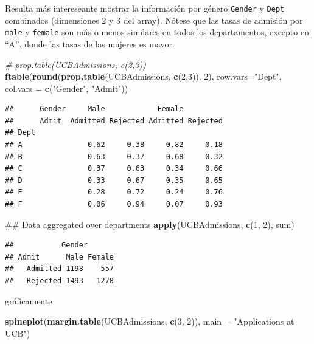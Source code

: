 \documentclass[]{article}
\newenvironment{Shaded}{\begin{snugshade}}{\end{snugshade}}
\newcommand{\KeywordTok}[1]{\textcolor[rgb]{0.13,0.29,0.53}{\textbf{{#1}}}}
\newcommand{\DataTypeTok}[1]{\textcolor[rgb]{0.13,0.29,0.53}{{#1}}}
\newcommand{\DecValTok}[1]{\textcolor[rgb]{0.00,0.00,0.81}{{#1}}}
\newcommand{\StringTok}[1]{\textcolor[rgb]{0.31,0.60,0.02}{{#1}}}
\newcommand{\CommentTok}[1]{\textcolor[rgb]{0.56,0.35,0.01}{\textit{{#1}}}}
\newcommand{\NormalTok}[1]{{#1}}
\numberwithin{equation}{section}
\begin{document}
Resulta más intereseante mostrar la información por género
\texttt{Gender} y \texttt{Dept} combinados (dimensiones 2 y 3 del
array). Nótese que las tasas de admisión por \texttt{male} y
\texttt{female} son más o menos similares en todos los departamentos,
excepto en ``A'', donde las tasas de las mujeres es mayor.

\begin{Shaded}
\begin{Highlighting}[]
\CommentTok{# prop.table(UCBAdmissions, c(2,3))}
\KeywordTok{ftable}\NormalTok{(}\KeywordTok{round}\NormalTok{(}\KeywordTok{prop.table}\NormalTok{(UCBAdmissions, }\KeywordTok{c}\NormalTok{(}\DecValTok{2}\NormalTok{,}\DecValTok{3}\NormalTok{)), }\DecValTok{2}\NormalTok{),}
       \DataTypeTok{row.vars=}\StringTok{"Dept"}\NormalTok{, }\DataTypeTok{col.vars =} \KeywordTok{c}\NormalTok{(}\StringTok{"Gender"}\NormalTok{, }\StringTok{"Admit"}\NormalTok{))}
\end{Highlighting}
\end{Shaded}

\begin{verbatim}
##      Gender     Male            Female         
##      Admit  Admitted Rejected Admitted Rejected
## Dept                                           
## A               0.62     0.38     0.82     0.18
## B               0.63     0.37     0.68     0.32
## C               0.37     0.63     0.34     0.66
## D               0.33     0.67     0.35     0.65
## E               0.28     0.72     0.24     0.76
## F               0.06     0.94     0.07     0.93
\end{verbatim}

\begin{Shaded}
\begin{Highlighting}[]
\NormalTok{## Data aggregated over departments}
\KeywordTok{apply}\NormalTok{(UCBAdmissions, }\KeywordTok{c}\NormalTok{(}\DecValTok{1}\NormalTok{, }\DecValTok{2}\NormalTok{), sum)}
\end{Highlighting}
\end{Shaded}

\begin{verbatim}
##           Gender
## Admit      Male Female
##   Admitted 1198    557
##   Rejected 1493   1278
\end{verbatim}

gráficamente

\begin{Shaded}
\begin{Highlighting}[]
\KeywordTok{spineplot}\NormalTok{(}\KeywordTok{margin.table}\NormalTok{(UCBAdmissions, }\KeywordTok{c}\NormalTok{(}\DecValTok{3}\NormalTok{, }\DecValTok{2}\NormalTok{)),}
           \DataTypeTok{main =} \StringTok{"Applications at UCB"}\NormalTok{)}
\end{Highlighting}
\end{Shaded}
\end{document}
